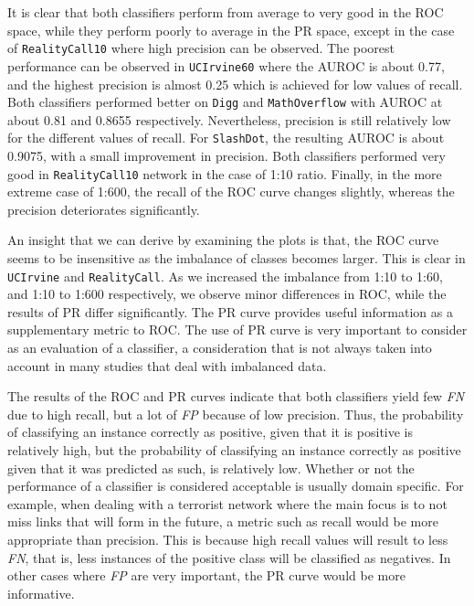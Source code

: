 \documentclass{acm_proc_article-sp}
\begin{document}
It is clear that both classifiers perform from average to very good in the ROC space, while they perform poorly to average in the PR space, except in the case of \texttt{RealityCall10} where high precision can be observed. The poorest performance can be observed in \texttt{UCIrvine60} where the AUROC is about 0.77, and the highest precision is almost 0.25 which is achieved for low values of recall. Both classifiers performed better on \texttt{Digg} and \texttt{MathOverflow} with AUROC at about 0.81 and 0.8655 respectively. Nevertheless, precision is still relatively low for the different values of recall. For \texttt{SlashDot}, the resulting AUROC is about 0.9075, with a small improvement in precision. Both classifiers performed very good in \texttt{RealityCall10} network in the case of 1:10 ratio. Finally, in the more extreme case of 1:600, the recall of the ROC curve changes slightly, whereas the precision deteriorates significantly.

An insight that we can derive by examining the plots is that, the ROC curve seems to be insensitive as the imbalance of classes becomes larger. This is clear in \texttt{UCIrvine} and \texttt{RealityCall}. As we increased the imbalance from 1:10 to 1:60, and 1:10 to 1:600 respectively, we observe minor differences in ROC, while the results of PR differ significantly. The PR curve provides useful information as a supplementary metric to ROC. The use of PR curve is very important to consider as an evaluation of a classifier, a consideration that is not always taken into account in many studies that deal with imbalanced data.

The results of the ROC and PR curves indicate that both classifiers yield few \textit{FN} due to high recall, but a lot of \textit{FP} because of low precision. Thus, the probability of classifying an instance correctly as positive, given that it is positive is relatively high, but the probability of classifying an instance correctly as positive given that it was predicted as such, is relatively low. Whether or not the performance of a classifier is considered acceptable is usually domain specific. For example, when dealing with a terrorist network where the main focus is to not miss links that will form in the future, a metric such as recall would be more appropriate than precision. This is because high recall values will result to less \textit{FN}, that is, less instances of the positive class will be classified as negatives. In other cases where \textit{FP} are very important, the PR curve would be more informative.
\end{document}
